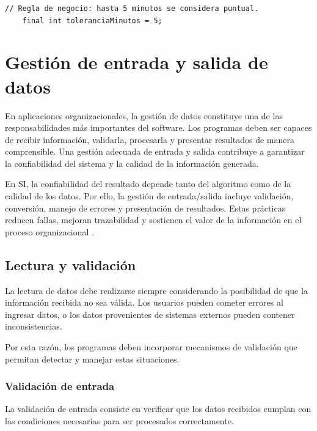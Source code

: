 \documentclass[12pt,twoside]{book}
\begin{document}
						\begin{lstlisting}[style=Java,caption={Comentario técnico sobre regla de negocio.}, label={lst:ComentarioReglaNegocio}]
	// Regla de negocio: hasta 5 minutos se considera puntual. 
	final int toleranciaMinutos = 5; \end{lstlisting}
						
			\section{Gestión de entrada y salida de datos}
				\noindent
				En aplicaciones organizacionales, la gestión de datos constituye una de las responsabilidades más importantes del software. Los programas deben ser capaces de recibir información, validarla, procesarla y presentar resultados de manera comprensible. Una gestión adecuada de entrada y salida contribuye a garantizar la confiabilidad del sistema y la calidad de la información generada.
				
				En SI, la confiabilidad del resultado depende tanto del algoritmo como de la calidad de los datos. Por ello, la gestión de entrada/salida incluye validación, conversión, manejo de errores y presentación de resultados. Estas prácticas reducen fallas, mejoran trazabilidad y sostienen el valor de la información en el proceso organizacional \cite{Laudon2020Management,Kendall2014Systems,Pressman2019Software}.
				
				\subsection{Lectura y validación}
					La lectura de datos debe realizarse siempre considerando la posibilidad de que la información recibida no sea válida. Los usuarios pueden cometer errores al ingresar datos, o los datos provenientes de sistemas externos pueden contener inconsistencias.
					
					Por esta razón, los programas deben incorporar mecanismos de validación que permitan detectar y manejar estas situaciones.
					
					\subsubsection{Validación de entrada}
						\noindent
						La validación de entrada consiste en verificar que los datos recibidos cumplan con las condiciones necesarias para ser procesados correctamente.
						
\end{document}
